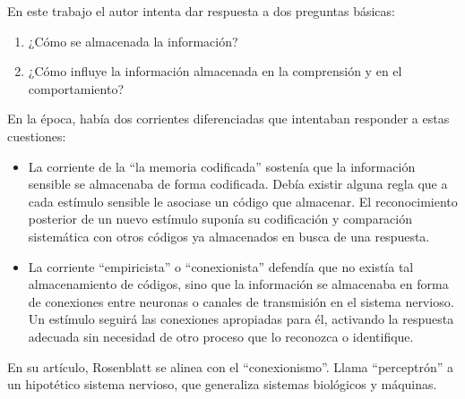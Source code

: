 \documentclass[11pt,twoside,titlepage,a4paper]{article}
\numberwithin{equation}{section} %
\theoremstyle{usual}
\begin{document}
    En este trabajo el autor intenta dar respuesta a dos preguntas básicas:
    \begin{enumerate}
        \item ¿Cómo se almacenada la información?
        \item ¿Cómo influye la información almacenada en la comprensión y en el comportamiento?
    \end{enumerate}
    
    En la época, había dos corrientes diferenciadas que intentaban responder a estas cuestiones:
    \begin{itemize}
        \item La corriente de la ``la memoria codificada'' sostenía que la información sensible se almacenaba de forma codificada. Debía existir alguna regla que a cada estímulo sensible le asociase un código que almacenar. El reconocimiento posterior de un nuevo estímulo suponía su codificación y comparación sistemática con otros códigos ya almacenados en busca de una respuesta.
        
        \item La corriente ``empiricista'' o ``conexionista'' defendía que no existía tal almacenamiento de códigos, sino que la información se almacenaba en forma de conexiones entre neuronas o canales de transmisión en el sistema nervioso. Un estímulo seguirá las conexiones apropiadas para él, activando la respuesta adecuada sin necesidad de otro proceso que lo reconozca o identifique.
    \end{itemize}
\restoregeometry
    En su artículo, Rosenblatt se alinea con el ``conexionismo''. Llama ``perceptrón'' a un hipotético sistema nervioso, que generaliza sistemas biológicos y máquinas.
    
\end{document}
